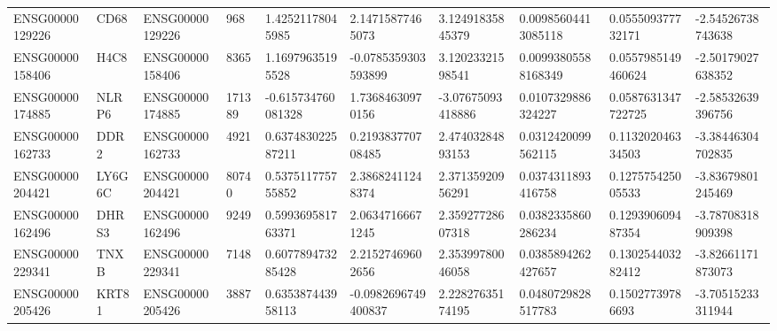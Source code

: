 \begin{tabular}{@{}llllllllll@{}}
ENSG00000129226 & CD68 & ENSG00000129226 & 968 & 1.42521178045985 & 2.14715877465073 & 3.12491835845379 & 0.00985604413085118 & 0.055509377732171 & -2.54526738743638 \\
ENSG00000158406 & H4C8 & ENSG00000158406 & 8365 & 1.16979635195528 & -0.0785359303593899 & 3.12023321598541 & 0.00993805588168349 & 0.0557985149460624 & -2.50179027638352 \\
ENSG00000174885 & NLRP6 & ENSG00000174885 & 171389 & -0.615734760081328 & 1.73684630970156 & -3.07675093418886 & 0.0107329886324227 & 0.0587631347722725 & -2.58532639396756 \\
ENSG00000162733 & DDR2 & ENSG00000162733 & 4921 & 0.637483022587211 & 0.219383770708485 & 2.47403284893153 & 0.0312420099562115 & 0.113202046334503 & -3.38446304702835 \\
ENSG00000204421 & LY6G6C & ENSG00000204421 & 80740 & 0.537511775755852 & 2.38682411248374 & 2.37135920956291 & 0.0374311893416758 & 0.127575425005533 & -3.83679801245469 \\
ENSG00000162496 & DHRS3 & ENSG00000162496 & 9249 & 0.599369581763371 & 2.06347166671245 & 2.35927728607318 & 0.0382335860286234 & 0.129390609487354 & -3.78708318909398 \\
ENSG00000229341 & TNXB & ENSG00000229341 & 7148 & 0.607789473285428 & 2.21527469602656 & 2.35399780046058 & 0.0385894262427657 & 0.130254403282412 & -3.82661171873073 \\
ENSG00000205426 & KRT81 & ENSG00000205426 & 3887 & 0.635387443958113 & -0.0982696749400837 & 2.22827635174195 & 0.0480729828517783 & 0.15027739786693 & -3.70515233311944 \\
\bottomrule
\end{tabular}
\endgroup
